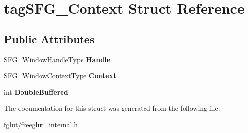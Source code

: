 \hypertarget{structtag_s_f_g___context}{}\section{tag\+S\+F\+G\+\_\+\+Context Struct Reference}
\label{structtag_s_f_g___context}
\subsection*{Public Attributes}
\begin{DoxyCompactItemize}
\item 
S\+F\+G\+\_\+\+Window\+Handle\+Type {\bfseries Handle}\hypertarget{structtag_s_f_g___context_a6936c3fdb2f357804d9fa4517587a876}{}\label{structtag_s_f_g___context_a6936c3fdb2f357804d9fa4517587a876}

\item 
S\+F\+G\+\_\+\+Window\+Context\+Type {\bfseries Context}\hypertarget{structtag_s_f_g___context_af9a5542536b66c0ed5e4410270457995}{}\label{structtag_s_f_g___context_af9a5542536b66c0ed5e4410270457995}

\item 
int {\bfseries Double\+Buffered}\hypertarget{structtag_s_f_g___context_ae6c431fff9065c70c60cad2676ea61b0}{}\label{structtag_s_f_g___context_ae6c431fff9065c70c60cad2676ea61b0}

\end{DoxyCompactItemize}


The documentation for this struct was generated from the following file\+:\begin{DoxyCompactItemize}
\item 
fglut/freeglut\+\_\+internal.\+h\end{DoxyCompactItemize}
